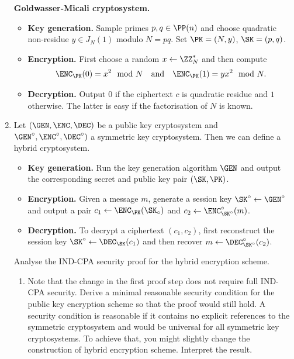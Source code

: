\documentclass{article}
\begin{document}
\begin{enumerate}
   
  \textbf{Goldwasser-Micali cryptosystem.}
  \begin{itemize}
  \item \textbf{Key generation.}  Sample primes $p,q\in\PP(n)$ and
    choose quadratic non-residue $y\in J_N(1)$ modulo $N=pq$. Set
    $\PK=(N,y)$, $\SK=(p,q)$.
  \item\textbf{Encryption.} First choose a random $x\gets\ZZ_N^*$ and then compute
    \begin{align*}
      \enc{0}=x^2\mod N \quad\text{and}\quad \enc{1}=yx^2\mod N.
    \end{align*}
  \item\textbf{Decryption.} Output $0$ if the ciphertext $c$ is
    quadratic residue and $1$ otherwise. The latter is easy if the
    factorisation of $N$ is known.
  \end{itemize}



\item Let $(\GEN,\ENC,\DEC)$ be a public key cryptosystem and
  $\GEN^\circ,\ENC^\circ,\DEC^\circ)$ a symmetric key cryptosystem. Then we can
  define a hybrid cryptosystem.
  \begin{itemize}
  \item \textbf{Key generation.} Run the key generation algorithm
    $\GEN$ and output the corresponding secret and public key pair
    $(\SK,\PK)$.
  \item \textbf{Encryption.} Given a message $m$, generate a session
    key $\SK^\circ\gets\GEN^\circ$ and output a pair
    $c_1\gets\enc{\SK_\circ}$ and $c_2\gets\ENC^\circ_{\SK^\circ}(m)$.
  \item\textbf{Decryption.} To decrypt a ciphertext $(c_1,c_2)$, first
    reconstruct the session key $\SK^\circ\gets\dec{c_1}$ and then
    recover  $m\gets\DEC^\circ_{\SK^\circ}(c_2)$.
  \end{itemize}
  Analyse the IND-CPA security proof for the hybrid encryption scheme.
  \begin{enumerate}
  \item Note that the change in the first proof step does not require
    full IND-CPA security. Derive a minimal reasonable security
    condition for the public key encryption scheme so that the proof
    would still hold. A security condition is reasonable if it
    contains no explicit references to the symmetric cryptosystem and
    would be universal for all symmetric key cryptosystems. To achieve
    that, you might slightly change the construction of hybrid 
    encryption scheme. Interpret the result. 
   

\end{enumerate}
\end{enumerate}
\end{document}
